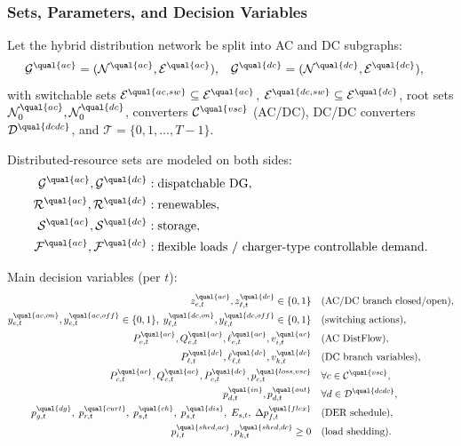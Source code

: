 \subsubsection{Sets, Parameters, and Decision Variables}

Let the hybrid distribution network be split into AC and DC subgraphs:
\begin{align}
\mathcal{G}^{\qual{ac}}&=(\mathcal{N}^{\qual{ac}},\mathcal{E}^{\qual{ac}}), &
\mathcal{G}^{\qual{dc}}&=(\mathcal{N}^{\qual{dc}},\mathcal{E}^{\qual{dc}}),
\end{align}
with switchable sets
\(\mathcal{E}^{\qual{ac,sw}}\subseteq\mathcal{E}^{\qual{ac}}\),
\(\mathcal{E}^{\qual{dc,sw}}\subseteq\mathcal{E}^{\qual{dc}}\), root sets
\(\mathcal{N}^{\qual{ac}}_0,\mathcal{N}^{\qual{dc}}_0\), converters
\(\mathcal{C}^{\qual{vsc}}\) (AC/DC), DC/DC converters
\(\mathcal{D}^{\qual{dcdc}}\), and
\(\mathcal{T}=\{0,1,\dots,T-1\}\).

Distributed-resource sets are modeled on both sides:
\begin{align}
\mathcal{G}^{\qual{ac}},\mathcal{G}^{\qual{dc}} &: \text{dispatchable DG}, \\
\mathcal{R}^{\qual{ac}},\mathcal{R}^{\qual{dc}} &: \text{renewables}, \\
\mathcal{S}^{\qual{ac}},\mathcal{S}^{\qual{dc}} &: \text{storage}, \\
\mathcal{F}^{\qual{ac}},\mathcal{F}^{\qual{dc}} &: \text{flexible loads / charger-type controllable demand}.
\end{align}

Main decision variables (per \(t\)):
\begin{align}
z^{\qual{ac}}_{e,t},z^{\qual{dc}}_{\ell,t}\in\{0,1\}
&\quad \text{(AC/DC branch closed/open)}, \\
y^{\qual{ac,on}}_{e,t},y^{\qual{ac,off}}_{e,t}\in\{0,1\},
\;
y^{\qual{dc,on}}_{\ell,t},y^{\qual{dc,off}}_{\ell,t}\in\{0,1\}
&\quad \text{(switching actions)}, \\
P^{\qual{ac}}_{e,t},Q^{\qual{ac}}_{e,t},\ell^{\qual{ac}}_{e,t},v^{\qual{ac}}_{i,t}
&\quad \text{(AC DistFlow)}, \\
P^{\qual{dc}}_{\ell,t},\ell^{\qual{dc}}_{\ell,t},v^{\qual{dc}}_{k,t}
&\quad \text{(DC branch variables)}, \\
P^{\qual{ac}}_{c,t},Q^{\qual{ac}}_{c,t},P^{\qual{dc}}_{c,t},p^{\qual{loss,vsc}}_{c,t}
&\quad \forall c\in\mathcal{C}^{\qual{vsc}}, \\
p^{\qual{in}}_{d,t},p^{\qual{out}}_{d,t}
&\quad \forall d\in\mathcal{D}^{\qual{dcdc}}, \\
p^{\qual{dg}}_{g,t},\; p^{\qual{curt}}_{r,t},\;
p^{\qual{ch}}_{s,t},\; p^{\qual{dis}}_{s,t},\; E_{s,t},\;
\Delta p^{\qual{flex}}_{f,t}
&\quad \text{(DER schedule)}, \\
p^{\qual{shed,ac}}_{i,t},p^{\qual{shed,dc}}_{k,t}\ge 0
&\quad \text{(load shedding)}.
\end{align}

